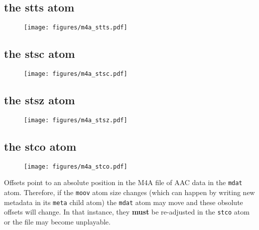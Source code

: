 \subsection{the stts atom}

\begin{figure}[h]
\texttt{[image: figures/m4a\_stts.pdf]}
\end{figure}

\subsection{the stsc atom}

\begin{figure}[h]
\texttt{[image: figures/m4a\_stsc.pdf]}
\end{figure}

\subsection{the stsz atom}

\begin{figure}[h]
\texttt{[image: figures/m4a\_stsz.pdf]}
\end{figure}

\pagebreak

\subsection{the stco atom}

\begin{figure}[h]
\texttt{[image: figures/m4a\_stco.pdf]}
\end{figure}
\par
\noindent
Offsets point to an absolute position in the M4A file of AAC data in
the \texttt{mdat} atom.  Therefore, if the \texttt{moov} atom size changes
(which can happen by writing new metadata in its \texttt{meta} child atom)
the \texttt{mdat} atom may move and these obsolute offsets will change.
In that instance, they \textbf{must}
be re-adjusted in the \texttt{stco} atom or the file may become unplayable.
